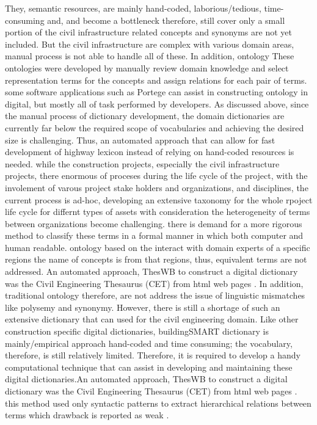 \documentclass[Journal,InsideFigs, DoubleSpace]{ascelike} %
\begin{document}
They, semantic resources, are mainly hand-coded, laborious/tedious, time-consuming and, and become a bottleneck therefore, still cover only a small portion of the civil infrastructure related concepts and synonyms are not yet included. But the civil infrastructure are complex with various domain areas, manual process is not able to handle all of these. In addition, ontology These ontologies were developed by manually review domain knowledge and select representation terms for the concepts and assign relations for each pair of terms. some software applications such as Portege can assist in constructing ontology in digital, but mostly all of task performed by developers. As discussed above, since the manual process of dictionary development, the domain dictionaries are currently far below the required scope of vocabularies and achieving the desired size is challenging. Thus, an automated approach that can allow for fast development of highway lexicon instead of relying on hand-coded resources is needed. while the construction projects, especially the civil infrastructure projects, there enormous of proceses during the life cycle of the project, with the involement of varous project stake holders and organizations, and disciplines, the current process is ad-hoc, developing an extensive taxonomy for the whole rpoject life cycle for differnt types of assets with consideration the heterogeneity of terms between organizations become challenging. there is demand for a more rigorous method to classify these terms in a formal manner in which both computer and human readable. ontology based on the interact with domain experts of a specific regions the name of concepts is from that regions, thus, equivalent terms are not addressed. 
%
An automated approach, ThesWB to construct a digital dictionary was the Civil Engineering Thesaurus (CET) from html web pages \cite{abuzir02}. In addition, traditional ontology therefore, are not address the issue of linguistic mismatches like polysemy and synonymy. However, there is still a shortage of such an extensive dictionary that can used for the civil engineering domain. Like other construction specific digital dictionaries, buildingSMART dictionary is mainly/empirical approach hand-coded and time consuming; the vocabulary, therefore, is still relatively limited. Therefore, it is required to develop a handy computational technique that can assist in developing and maintaining these digital dictionaries.An automated approach, ThesWB to construct a digital dictionary was the Civil Engineering Thesaurus (CET) from html web pages \cite{abuzir02}. this method used only syntactic patterns to extract hierarchical relations between terms which drawback is reported as weak \cite{Marcus95}. 
\end{document}

